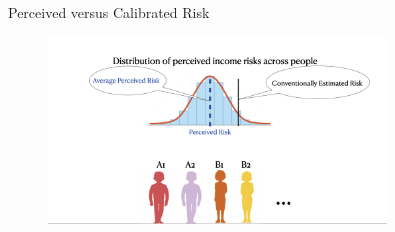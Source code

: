 \documentclass{beamer}
\begin{document}
\begin{frame}{Perceived versus Calibrated Risk}
	\begin{figure}
		\centering
		\label{fig: findings}
		\includegraphics[width=0.8\textwidth]{figures/2findings.png}
	\end{figure}
	
\end{frame}
\end{document}
